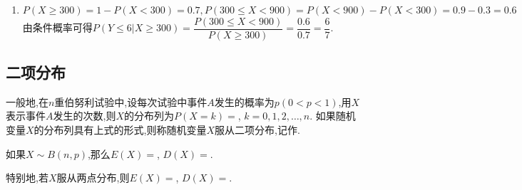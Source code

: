 \begin{enumerate}
\begin{jieda}
\begin{enumerate}
        $Y$的分布列为
        $\begin{pmatrix}
            0& 2& 6& 10\\  
            0.3& 0.4& 0.2& 0.1
        \end{pmatrix}$
        
        $\therefore E\left( Y\right)  = 0 \times  {0.3} + 2 \times  {0.4} + 6 \times  {0.2} + {10} \times  {0.1} = 3$
        $D\left( Y\right)  = {\left( 0 - 3\right) }^{2} \times  {0.3} + {\left( 2 - 3\right) }^{2} \times  {0.4} + \left( {6 - 3}\right)$
        ${}^{2} \times  {0.2} + {\left( {10} - 3\right) }^{2} \times  {0.1} = {9.8}$
        $\therefore$ 工期延误天数Y的均值为3,方差为9.8；
        
        \item $P\left( {X \geq  {300}}\right)  = 1 - P\left( {X < {300}}\right)  = {0.7},P(300\leq X<900) =P (X<900) -P (X<300) = {0.9} - {0.3} = {0.6}$
        由条件概率可得$P(Y\leq6|X\geq300)=
        \dfrac{P\left( {{300} \leq  X < {900}}\right) }{P\left( {X \geq  {300}}\right) } = \dfrac{0.6}{0.7} = \dfrac{6}{7}.$
    \end{enumerate}
\end{jieda}




    
\end{enumerate}



\clearpage

\subsection*{二项分布}



一般地,在$n$重伯努利试验中,设每次试验中事件$A$发生的概率为$p(0<p<1)$,用$X$表示事件$A$发生的次数,则$X$的分布列为$P(X=k)=$, $k=0, 1, 2, \dots, n$. 如果随机变量$X$的分布列具有上式的形式,则称随机变量$X$服从二项分布,记作.

如果$X\sim B(n, p)$,那么$E(X)=$, $D(X)=$.

特别地,若$X$服从两点分布,则$E(X)=$, $D(X)=$.


